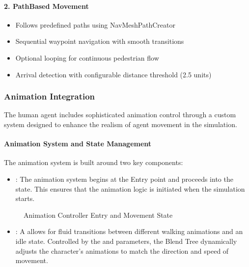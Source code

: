 \documentclass[letterpaper,10pt,english]{jupyterBook}
\begin{document}
\paragraph{2. Path\sphinxhyphen{}Based Movement}
\label{\detokenize{Human Agent:path-based-movement}}\begin{itemize}
\item {} 
\sphinxAtStartPar
Follows predefined paths using NavMeshPathCreator

\item {} 
\sphinxAtStartPar
Sequential waypoint navigation with smooth transitions

\item {} 
\sphinxAtStartPar
Optional looping for continuous pedestrian flow

\item {} 
\sphinxAtStartPar
Arrival detection with configurable distance threshold (2.5 units)

\end{itemize}


\subsubsection{Animation Integration}
\label{\detokenize{Human Agent:animation-integration}}
\sphinxAtStartPar
The human agent includes sophisticated animation control through a custom  system designed to enhance the realism of agent movement in the simulation.


\paragraph{Animation System and State Management}
\label{\detokenize{Human Agent:animation-system-and-state-management}}
\sphinxAtStartPar
The animation system is built around two key components:
\begin{itemize}
\item {} 
\sphinxAtStartPar
{}: The animation system begins at the Entry point and proceeds into the  state. This ensures that the animation logic is initiated when the simulation starts.

\end{itemize}

\begin{figure}[htbp]
\centering
\capstart

\noindent{}
\caption{Animation Controller Entry and Movement State}\label{\detokenize{Human Agent:animation-controller}}\end{figure}
\begin{itemize}
\item {} 
\sphinxAtStartPar
{}: A  allows for fluid transitions between different walking animations and an idle state. Controlled by the  and  parameters, the Blend Tree dynamically adjusts the character’s animations to match the direction and speed of movement.

\end{itemize}
\end{document}
